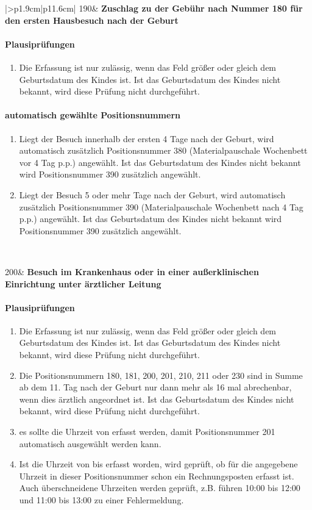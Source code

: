 \begin{mpsupertabular}{|>{\centering}p{1.9cm}|p{11.6cm}|}
190&
\textbf{Zuschlag zu der Gebühr nach Nummer 180 für den
ersten Hausbesuch nach der Geburt}
\paragraph{Plausiprüfungen}
\begin{enumerate}
\item
Die Erfassung ist nur zulässig, wenn das Feld  größer 
oder gleich dem Geburtsdatum des Kindes ist. Ist das Geburtsdatum des
Kindes nicht bekannt, wird diese Prüfung nicht durchgeführt.
\end{enumerate}
\paragraph{automatisch gewählte Positionsnummern}
\begin{enumerate}
\item
Liegt der Besuch innerhalb der ersten 4 Tage nach der Geburt, wird
automatisch zusätzlich Positionsnummer 380 (Materialpauschale Wochenbett
vor 4 Tag p.p.) angewählt. Ist das Geburtsdatum des Kindes nicht bekannt
wird Positionsnummer 390 zusätzlich angewählt.
\item
Liegt der Besuch 5 oder mehr Tage nach der Geburt, wird
automatisch zusätzlich Positionsnummer 390 (Materialpauschale Wochenbett
nach 4 Tag p.p.) angewählt. Ist das Geburtsdatum des Kindes nicht bekannt
wird Positionsnummer 390 zusätzlich angewählt.
\end{enumerate}
\\ \hline



200&
\textbf{Besuch im Krankenhaus oder in einer außerklinischen Einrichtung
unter ärztlicher Leitung}
\paragraph{Plausiprüfungen}
\begin{enumerate}
\item
Die Erfassung ist nur zulässig, wenn das Feld  größer 
oder gleich dem Geburtsdatum des Kindes ist. Ist das Geburtsdatum des
Kindes nicht bekannt, wird diese Prüfung nicht durchgeführt.
\item
Die Positionsnummern 180, 181, 200, 201, 210, 211 oder 230 sind in Summe 
ab dem 11. Tag nach der Geburt nur dann mehr 
als 16 mal abrechenbar, wenn dies ärztlich angeordnet ist.
Ist das Geburtsdatum des
Kindes nicht bekannt, wird diese Prüfung nicht durchgeführt.
\item
es sollte die Uhrzeit von erfasst werden, damit Positionsnummer 201 
automatisch ausgewählt werden kann.
\item
Ist die Uhrzeit von bis erfasst worden, wird geprüft, ob für die angegebene 
Uhrzeit in dieser Positionsnummer
schon ein Rechnungsposten erfasst ist. Auch überschneidene Uhrzeiten
werden geprüft, z.B. führen 10:00 bis 12:00 und 11:00 bis 13:00 zu einer
Fehlermeldung.
\end{enumerate}

\end{mpsupertabular}
